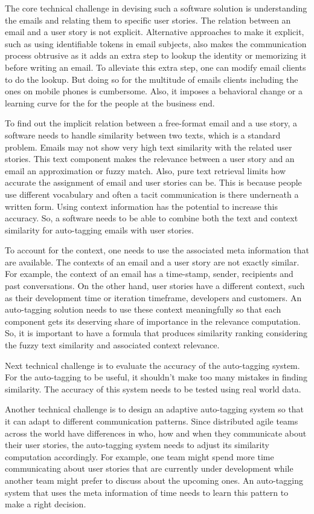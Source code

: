 The core technical challenge in devising such a software solution is understanding the emails and relating them to specific user stories. The relation between an email and a user story is not explicit. Alternative approaches to make it explicit, such as using identifiable tokens in email subjects, also makes the communication process obtrusive as it adds an extra step to lookup the identity or memorizing it before writing an email. To alleviate this extra step, one can modify email clients to do the lookup. But doing so for the multitude of emails clients including the ones on mobile phones is cumbersome. Also, it imposes a behavioral change or a learning curve for the for the people at the business end.

To find out the implicit relation between a free-format email and a use story, a software needs to handle similarity between two texts, which is a standard problem. Emails may not show very high text similarity with the related user stories. This text component makes the relevance between a user story and an email an approximation or fuzzy match. Also, pure text retrieval limits how accurate the assignment of email and user stories can be. This is because people use different vocabulary and often a tacit communication is there underneath a written form. Using context information has the potential to increase this accuracy. So, a software needs to be able to combine both the text and context similarity for auto-tagging emails with user stories.

To account for the context, one needs to use the associated meta information that are available. The contexts of an email and a user story are not exactly similar. For example, the context of an email has a time-stamp, sender, recipients and past conversations. On the other hand, user stories have a different context, such as their development time or iteration timeframe, developers and customers. An auto-tagging solution needs to use these context meaningfully so that each component gets its deserving share of importance in the relevance computation. So, it is important to have a formula that produces similarity ranking considering the fuzzy text similarity and associated context relevance.

Next technical challenge is to evaluate the accuracy of the auto-tagging system. For the auto-tagging to be useful, it shouldn't make too many mistakes in finding similarity. The accuracy of this system needs to be tested using real world data. 

Another technical challenge is to design an adaptive auto-tagging system so that it can adapt to different communication patterns. Since distributed agile teams across the world have differences in who, how and when they communicate about their user stories, the auto-tagging system needs to adjust its similarity computation accordingly. For example, one team might spend more time communicating about user stories that are currently under development while another team might prefer to discuss about the upcoming ones. An auto-tagging system that uses the meta information of time needs to learn this pattern to make a right decision.


